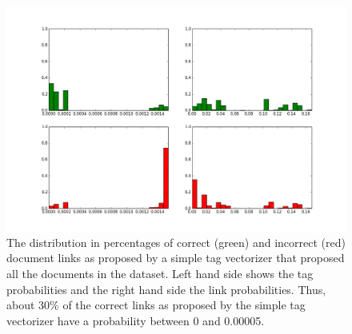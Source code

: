 \begin{figure}
\includegraphics[width =\textwidth]{images/probabilities}
\caption{The distribution in percentages of correct (green) and incorrect (red) document links as proposed by a simple tag vectorizer that proposed all the documents in the dataset. Left hand side shows the tag probabilities and the right hand side the link probabilities. Thus, about 30\% of the correct links as proposed by the simple tag vectorizer have a probability between 0 and 0.00005.}
\label{distribution}
\end{figure}


